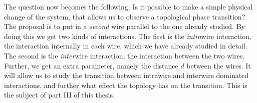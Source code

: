 \vspace{1cm}
The question now becomes the following. Is it possible to make a simple physical change of the system, that allows us to observe a topological phase transition? The proposal is to put in a \textit{second} wire parallel to the one already studied. By doing this we get two kinds of interactions. The first is the \textit{intra}wire interaction, the interaction internally in each wire, which we have already studied in detail. The second is the \textit{inter}wire interaction, the interaction between the two wires. Further, we get an extra parameter, namely the distance $d$ between the wires. It will allow us to study the transition between intrawire and interwire dominated interactions, and further what effect the topology has on the transition. This is the subject of part III of this thesis. 

